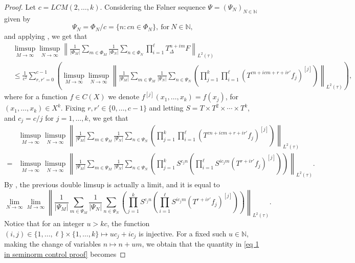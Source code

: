 \documentclass[letter, 11pt]{article}
\theoremstyle{definition}
\theoremstyle{plain}
\newcommand{\N}{\mathbb{N}}
\newcommand{\norm}[1]{\left\lVert#1\right\rVert}
\providecommand{\norm}[1]{\lVert #1\rVert}
\newcommand{\1}{\mathbbm{1}}
\begin{document}
\begin{proof}
    Let $c = LCM(2, \ldots, k)$. Considering the F\o lner sequence $\Psi=(\Psi_N)_{N\in \N}$ given by 
\begin{equation*}
    \Psi_N = \Phi_N/c = \{ n : cn \in \Phi_N\},\ \text{for}\ N\in \N, 
\end{equation*}
and applying \cite[Lemma $6.8$]{kmrr25}, we get that 
\begin{align*}
     & \limsup_{M \to \infty} \limsup_{N \to \infty} \norm{ \frac{1}{|\Phi_M|} \sum_{m \in \Phi_M} \frac{1}{|\Phi_N|} \sum_{n \in \Phi_N} \prod_{i=1}^{\ell} T_\Delta^{n+im} F }_{L^2(\tau)}  \\
     &\leq \frac{1}{c^2} \sum_{r,r'=0}^{c-1} \left( \limsup_{M \to \infty} \limsup_{N \to \infty}  \norm{ \frac{1}{|\Psi_M|} \sum_{m \in \Psi_M} \frac{1}{|\Psi_N|} \sum_{n \in \Psi_N} \left( \prod_{j=1}^{k}\prod_{i=1}^{\ell} (T^{cn+icm+r+ir'} f_{j})^{[j]} \right) }_{L^2(\tau)}  \right),
\end{align*}
where for a function $f \in C(X)$ we denote $f^{[j]}(x_1, \ldots, x_k) = f(x_j)$, for $(x_1, \ldots, x_k) \in X^k$. Fixing $r,r' \in \{0, \ldots , c-1\}$ and letting $S= T \times T^2 \times \cdots \times T^k$,  and $c_j = c/j$ for $j=1, \ldots, k$, we get that 
\begin{align*}
    &\limsup_{M \to \infty} \limsup_{N \to \infty}  \norm{ \frac{1}{|\Psi_M|} \sum_{m \in \Psi_M} \frac{1}{|\Psi_N|} \sum_{n \in \Psi_N} \left( \prod_{j=1}^{k}\prod_{i=1}^{\ell}  (T^{cn+icm+r+ir'} f_{j})^{[j]} \right) }_{L^2(\tau)}  \\
    = & \limsup_{M \to \infty} \limsup_{N \to \infty}  \norm{ \frac{1}{|\Psi_M|} \sum_{m \in \Psi_M} \frac{1}{|\Psi_N|} \sum_{n \in \Psi_N} \left( \prod_{j=1}^{k} S^{c_jn} \left( \prod_{i=1}^{\ell} S^{ic_jm} (T^{r+ir'}f_{j})^{[j]} \right) \right) }_{L^2(\tau)}. 
\end{align*}
By \cite[Theorem 1.1]{Zorin-Kranich16}, the previous double limsup is actually a limit, and it is equal to  
\begin{equation}\label{eq 1 in seminorm control proof}
\lim_{N\to \infty}\lim_{M\to \infty} \norm{ \frac{1}{|\Psi_M|} \sum_{m \in \Psi_M} \frac{1}{|\Psi_N|} \sum_{n \in \Psi_N} \left( \prod_{j=1}^{k} S^{c_jn} \left( \prod_{i=1}^{\ell} S^{ic_jm} (T^{r+ir'}f_{j})^{[j]} \right) \right) }_{L^2(\tau)}.  
\end{equation}
Notice that for an integer $u>k c$, the function $(i,j)\in \{1, \ldots, \ell\}\times \{1, \ldots, k\}\mapsto uc_j + ic_j$ is injective. For a fixed such $u\in \N$, making the change of variables $n\mapsto n+ um$, we obtain that the quantity in \eqref{eq 1 in seminorm control proof} becomes

\end{proof}
\end{document}
